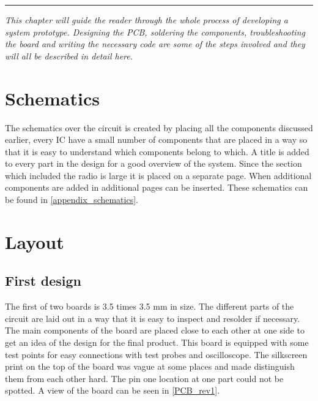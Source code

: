 \vspace{-10ex}%
\rule{\textwidth}{0.3pt}
\vspace{10ex}

\emph{
This chapter will guide the reader through the whole process of developing a system prototype. Designing the PCB, soldering the components, troubleshooting the board and writing the necessary code are some of the steps involved and they will all be described in detail here.
}

\section{Schematics}
The schematics over the circuit is created by placing all the components discussed earlier, every IC have a small number of components that are placed in a way so that it is easy to understand which components belong to which. A title is added to every part in the design for a good overview of the system. Since the section which included the radio is large it is placed on a separate page. When additional components are added in additional pages can be inserted. These schematics can be found in \autoref{appendix_schematics}.

\section{Layout} 
\subsection{First design} The first of two boards is 3.5 times 3.5 mm in size. The different parts of the circuit are laid out in a way that it is easy to inspect and resolder if necessary. The main components of the board are placed close to each other at one side to get an idea of the design for the final product. This board is equipped with some test points for easy connections with test probes and oscilloscope. The silkscreen print on the top of the board was vague at some places and made distinguish them from each other hard. The pin one location at one part could not be spotted.  A view of the board can be seen in \autoref{PCB_rev1}. 

